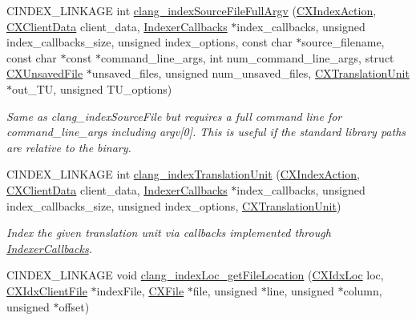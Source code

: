 \begin{DoxyCompactItemize}
\mbox{\label{group__CINDEX__HIGH_ga3b08166c97a48146a4a0395876332327}} 
C\+I\+N\+D\+E\+X\+\_\+\+L\+I\+N\+K\+A\+GE int \hyperlink{group__CINDEX__HIGH_ga3b08166c97a48146a4a0395876332327}{clang\+\_\+index\+Source\+File\+Full\+Argv} (\hyperlink{group__CINDEX__HIGH_gac8d30d3e3fb34d887b611e7c6de3afb6}{C\+X\+Index\+Action}, \hyperlink{group__CINDEX_gacfa40c3de26d228c0d898403c2c21612}{C\+X\+Client\+Data} client\+\_\+data, \hyperlink{structIndexerCallbacks}{Indexer\+Callbacks} $\ast$index\+\_\+callbacks, unsigned index\+\_\+callbacks\+\_\+size, unsigned index\+\_\+options, const char $\ast$source\+\_\+filename, const char $\ast$const $\ast$command\+\_\+line\+\_\+args, int num\+\_\+command\+\_\+line\+\_\+args, struct \hyperlink{structCXUnsavedFile}{C\+X\+Unsaved\+File} $\ast$unsaved\+\_\+files, unsigned num\+\_\+unsaved\+\_\+files, \hyperlink{group__CINDEX_gacdb7815736ca709ce9a5e1ec2b7e16ac}{C\+X\+Translation\+Unit} $\ast$out\+\_\+\+TU, unsigned T\+U\+\_\+options)
\begin{DoxyCompactList}\small\item\em Same as clang\+\_\+index\+Source\+File but requires a full command line for {\ttfamily command\+\_\+line\+\_\+args} including argv\mbox{[}0\mbox{]}. This is useful if the standard library paths are relative to the binary. \end{DoxyCompactList}\item 
C\+I\+N\+D\+E\+X\+\_\+\+L\+I\+N\+K\+A\+GE int \hyperlink{group__CINDEX__HIGH_gab12a0795c7d7be6e7ec85679faf3f8e9}{clang\+\_\+index\+Translation\+Unit} (\hyperlink{group__CINDEX__HIGH_gac8d30d3e3fb34d887b611e7c6de3afb6}{C\+X\+Index\+Action}, \hyperlink{group__CINDEX_gacfa40c3de26d228c0d898403c2c21612}{C\+X\+Client\+Data} client\+\_\+data, \hyperlink{structIndexerCallbacks}{Indexer\+Callbacks} $\ast$index\+\_\+callbacks, unsigned index\+\_\+callbacks\+\_\+size, unsigned index\+\_\+options, \hyperlink{group__CINDEX_gacdb7815736ca709ce9a5e1ec2b7e16ac}{C\+X\+Translation\+Unit})
\begin{DoxyCompactList}\small\item\em Index the given translation unit via callbacks implemented through \hyperlink{structIndexerCallbacks}{Indexer\+Callbacks}. \end{DoxyCompactList}\item 
C\+I\+N\+D\+E\+X\+\_\+\+L\+I\+N\+K\+A\+GE void \hyperlink{group__CINDEX__HIGH_ga340d2dda7a0d3430fe9929034c1b712c}{clang\+\_\+index\+Loc\+\_\+get\+File\+Location} (\hyperlink{structCXIdxLoc}{C\+X\+Idx\+Loc} loc, \hyperlink{group__CINDEX__HIGH_ga6fd9c59c0b0a0a21622e5bcfc08156cc}{C\+X\+Idx\+Client\+File} $\ast$index\+File, \hyperlink{group__CINDEX__FILES_gacfcea9c1239c916597e2e5b3e109215a}{C\+X\+File} $\ast$file, unsigned $\ast$line, unsigned $\ast$column, unsigned $\ast$offset)

\end{DoxyCompactItemize}
